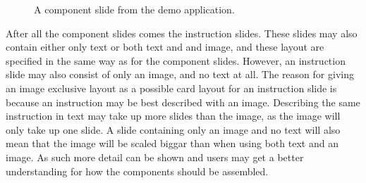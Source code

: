 	\begin{figure}[ht!]
		\centering
   		 \qquad
   		 \qquad
		\caption{A component slide from the demo application.}
		\label{glassDemoComponentColumn}
	\end{figure}

After all the component slides comes the instruction slides. These slides may also contain either only text or both text and and image, and these layout are specified in the same way as for the component slides. However, an instruction slide may also consist of only an image, and no text at all. The reason for giving an image exclusive layout as a possible card layout for an instruction slide is because an instruction may be best described with an image. Describing the same instruction in text may take up more slides than the image, as the image will only take up one slide. A slide containing only an image and no text will also mean that the image will be scaled biggar than when using both text and an image. As such more detail can be shown and users may get a better understanding for how the components should be assembled.

